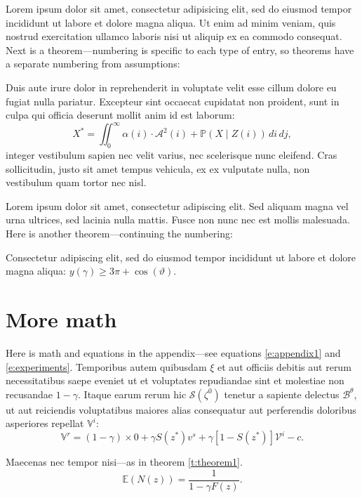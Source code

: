 Lorem ipsum dolor sit amet, consectetur adipisicing elit, sed do eiusmod
tempor incididunt ut labore et dolore magna aliqua. Ut enim ad minim veniam,
quis nostrud exercitation ullamco laboris nisi ut aliquip ex ea commodo
consequat. Next is a theorem---numbering is specific to each type of entry, so theorems have a separate numbering from assumptions:
\begin{theorem}
Duis aute irure dolor in reprehenderit in voluptate velit esse
cillum dolore eu fugiat nulla pariatur. Excepteur sint occaecat cupidatat non
proident, sunt in culpa qui officia deserunt mollit anim id est laborum:
\begin{equation}
X^* =\iint_{0}^{\infty} \alpha(i) \cdot \mathcal{A}^2(i) + \mathbb{P}(X\mid Z(i))\,di\,dj,\end{equation}
integer vestibulum sapien nec velit varius, nec scelerisque nunc eleifend. Cras sollicitudin, justo sit amet tempus vehicula, ex ex vulputate nulla, non vestibulum quam tortor nec nisl. 
\end{theorem}

Lorem ipsum dolor sit amet, consectetur adipiscing elit. Sed aliquam magna vel urna ultrices, sed lacinia nulla mattis. Fusce non nunc nec est mollis malesuada. Here is another theorem---continuing the numbering:
\begin{theorem}
Consectetur adipiscing elit, sed do eiusmod tempor incididunt ut labore et dolore magna aliqua: $y(\gamma) \geq 3\pi + \cos(\vartheta)$.
\label{t:theorem1}\end{theorem}

\leavevmode

\section{More math}

Here is math and equations in the appendix---see equations \eqref{e:appendix1} and \eqref{e:experiments}. Temporibus autem quibusdam $\xi$ et aut officiis debitis aut rerum necessitatibus saepe eveniet ut et voluptates repudiandae sint et molestiae non recusandae $1-\gamma$. Itaque earum rerum hic $\mathcal{S}(\zeta^0)$ tenetur a sapiente delectus $\mathcal{B}^\theta$, ut aut reiciendis voluptatibus maiores alias consequatur aut perferendis doloribus asperiores repellat $\mathbb{V}^i$:
\begin{equation}
\mathbb{V}^r = (1-\gamma) \times 0 +\gamma S(z^*) v^s+\gamma [1-S(z^*)] \mathcal{V}^i-c.
\label{e:appendix1}\end{equation}

Maecenas nec tempor nisi---as in theorem \ref{t:theorem1}.
\leavevmode
\begin{equation}
\mathbb{E}(N(z)) = \frac{1}{1-\gamma F(z)}.
\label{e:experiments}\end{equation}

